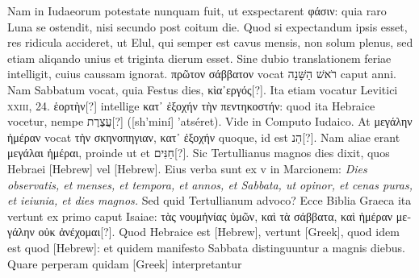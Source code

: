 Nam in Iudaeorum potestate
nunquam fuit, ut exspectarent \textgreek{φάσιν}:
 quia raro Luna se ostendit,
nisi secundo post coitum die.
Quod si expectandum ipsis esset,
res ridicula accideret, ut Elul, qui semper est cavus mensis, non solum
plenus, sed etiam aliqando unius et triginta dierum esset.
Sine dubio translationem feriae intelligit, cuius caussam ignorat.
\textgreek{πρῶτον σάββατον} vocat
 \texthebrew{רֹאשׁ הַשָּׁנָה‎}
 caput anni.
Nam Sabbatum vocat, quia Festus
dies, \textgreek{κὶα᾽εργός}[?].
Ita etiam vocatur Levitici \textsc{xxiii}, 24.
\textgreek{ἑορτὴν}[?]
 intellige
\textgreek{κατ᾽ ἐξοχήν τὴν πεντηκοστήν}:
 quod ita Hebraice vocetur, nempe \texthebrew{עֲצֶרֶת}[?] ([sh'miní] 'atséret).
Vide in Computo Iudaico.
At \textgreek{μεγάλην ἡμέραν}
 vocat \textgreek{τὴν σκηνοπηγιαν, κατ᾽ ἐξοχήν}
 quoque, id est \texthebrew{הַנ}[?].
Nam aliae erant \textgreek{μεγάλαι ἡμέραι},
proinde ut et \texthebrew{חַנִּים}[?].
Sic Tertullianus magnos dies dixit, quos
Hebraei \texthebrew{[Hebrew]} vel \texthebrew{[Hebrew]}.
Eius verba sunt ex v in Marcionem:
\textit{Dies observatis, et menses, et tempora, et annos, et Sabbata, ut opinor,
et cenas puras, et ieiunia, et dies magnos.}
Sed quid Tertullianum
advoco?
Ecce Biblia Graeca ita vertunt ex primo caput Isaiae:
\textgreek{τὰς νουμἠνίας ὑμῶν, καὶ τὰ σάββατα,
 καὶ ἡμέραν μεγάλην οὐκ ἀνέχομαι}[?].
Quod Hebraice est \texthebrew{[Hebrew]},
 vertunt \textgreek{[Greek]}, quod idem
est quod \texthebrew{[Hebrew]}: et quidem manifesto Sabbata distinguuntur a
magnis diebus. 
Quare perperam quidam \textgreek{[Greek]} interpretantur
